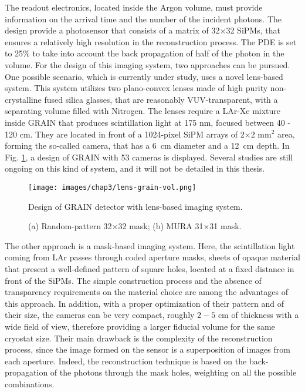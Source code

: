 The readout electronics, located inside the Argon volume, must provide information on the arrival time and the number of the incident photons.
The design provide a photosensor that consists of a matrix of 32$\times$32 SiPMs, that ensures a relatively high resolution in the reconstruction process. The PDE is set to 25\% to take into account the back propagation of half of the photon in the volume. For the design of this imaging system, two approaches can be pursued. One possible scenario, which is currently under study, uses a novel lens-based system. This system utilizes two plano-convex lenses made of high purity non-crystalline fused silica glasses, that are reasonably VUV-transparent, with a separating volume filled with Nitrogen. 
The lenses require a LAr-Xe mixture inside GRAIN that produces scintillation light at 175 nm, focused between 40 - 120 cm. They are located in front of a 1024-pixel SiPM arrays of 2$\times$2 $\text{mm}^2$ area, forming the so-called camera, that has a 6~cm diameter and a 12~cm depth. In Fig. \ref{fig:lenses}, a design of GRAIN with 53 cameras is displayed. Several studies are still ongoing on this kind of system, and it will not be detailed in this thesis.

\begin{figure}[h!]
    \centering
    \texttt{[image: images/chap3/lens-grain-vol.png]}
    \caption{Design of GRAIN detector with lens-based imaging system.}
    \label{fig:lenses}
\end{figure}

\begin{figure}[h!]
    \centering
    \caption{(a) Random-pattern 32$\times$32 mask; (b) MURA 31$\times$31 mask.}
    \label{fig:patterns}
\end{figure}

The other approach is a mask-based imaging system. Here, the scintillation light coming from LAr passes through coded aperture masks, sheets of opaque material that present a well-defined pattern of square holes, located at a fixed distance in front of the SiPMs. The simple construction process and the absence of transparency requirements on the material choice are among the advantages of this approach. In addition, with a proper optimization of their pattern and of their size, the cameras can be very compact, roughly $2-5$ cm of thickness with a wide field of view, therefore providing a larger fiducial volume for the same cryostat size. Their main drawback is the complexity of the reconstruction process, since the image formed on the sensor is a superposition of images from each aperture. Indeed, the reconstruction technique is based on the back-propagation of the photons through the mask holes, weighting on all the possible combinations. 

